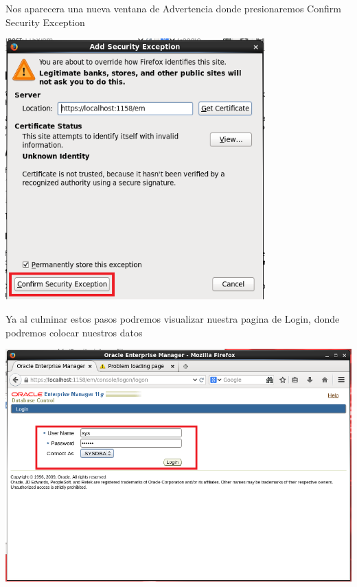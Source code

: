 Nos aparecera una nueva ventana de Advertencia donde presionaremos Confirm Security Exception
\begin{center}
	\includegraphics[width=10cm]{./Imagenes/90} 
\end{center}

Ya al culminar estos pasos podremos visualizar nuestra pagina de Login, donde podremos colocar nuestros datos
\begin{center}
	\includegraphics[width=15cm]{./Imagenes/92} 
\end{center}

